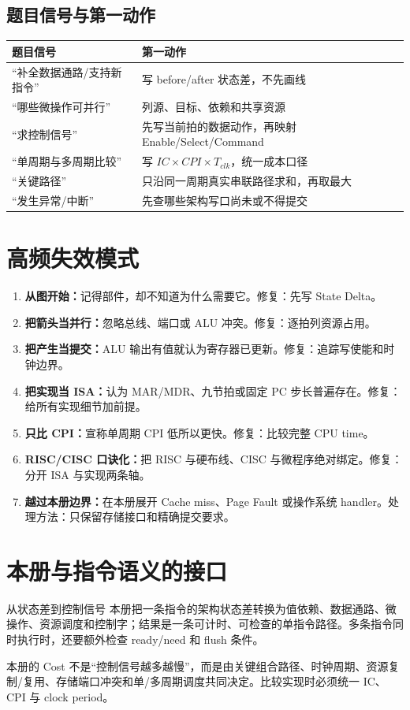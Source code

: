 \documentclass[UTF8,fontset=fandol,11pt,a4paper]{ctexart}
\newcommand{\kw}[1]{\textbf{\color{deep}#1}}
\begin{document}
\subsection{题目信号与第一动作}

\begin{center}
\small
\begin{tabularx}{\linewidth}{L{4.1cm}Y}
\toprule
题目信号 & 第一动作 \\
\midrule
“补全数据通路/支持新指令” & 写 before/after 状态差，不先画线 \\
“哪些微操作可并行” & 列源、目标、依赖和共享资源 \\
“求控制信号” & 先写当前拍的数据动作，再映射 Enable/Select/Command \\
“单周期与多周期比较” & 写 $IC\times CPI\times T_{clk}$，统一成本口径 \\
“关键路径” & 只沿同一周期真实串联路径求和，再取最大 \\
“发生异常/中断” & 先查哪些架构写口尚未或不得提交 \\
\bottomrule
\end{tabularx}
\end{center}

\section{高频失效模式}

\begin{enumerate}
  \item \kw{从图开始：}记得部件，却不知道为什么需要它。修复：先写 State Delta。
  \item \kw{把箭头当并行：}忽略总线、端口或 ALU 冲突。修复：逐拍列资源占用。
  \item \kw{把产生当提交：}ALU 输出有值就认为寄存器已更新。修复：追踪写使能和时钟边界。
  \item \kw{把实现当 ISA：}认为 MAR/MDR、九节拍或固定 PC 步长普遍存在。修复：给所有实现细节加前提。
  \item \kw{只比 CPI：}宣称单周期 CPI 低所以更快。修复：比较完整 CPU time。
  \item \kw{RISC/CISC 口诀化：}把 RISC 与硬布线、CISC 与微程序绝对绑定。修复：分开 ISA 与实现两条轴。
  \item \kw{越过本册边界：}在本册展开 Cache miss、Page Fault 或操作系统 handler。处理方法：只保留存储接口和精确提交要求。
\end{enumerate}

\section{本册与指令语义的接口}
\begin{corebox}{从状态差到控制信号}
本册把一条指令的架构状态差转换为值依赖、数据通路、微操作、资源调度和控制字；结果是一条可计时、可检查的单指令路径。多条指令同时执行时，还要额外检查 ready/need 和 flush 条件。
\end{corebox}
本册的 Cost 不是“控制信号越多越慢”，而是由关键组合路径、时钟周期、资源复制/复用、存储端口冲突和单/多周期调度共同决定。比较实现时必须统一 IC、CPI 与 clock period。
\end{document}
